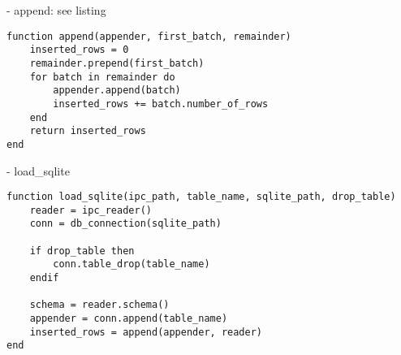 - append: see listing
\begin{listing}
	\begin{verbatim}
function append(appender, first_batch, remainder)
	inserted_rows = 0
	remainder.prepend(first_batch)
	for batch in remainder do
		appender.append(batch)
		inserted_rows += batch.number_of_rows
	end
	return inserted_rows
end
	\end{verbatim}
\end{listing}

- load\_sqlite
\begin{listing}
	\begin{verbatim}
function load_sqlite(ipc_path, table_name, sqlite_path, drop_table)
	reader = ipc_reader()
	conn = db_connection(sqlite_path)

	if drop_table then
		conn.table_drop(table_name)
	endif

	schema = reader.schema()
	appender = conn.append(table_name)
	inserted_rows = append(appender, reader)
end
	\end{verbatim}
\end{listing}

